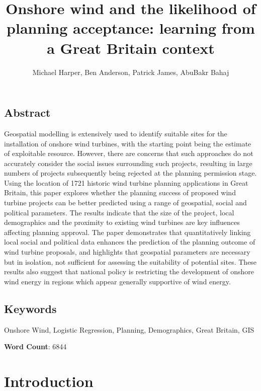 \documentclass[a4paper,]{article}
\title{Onshore wind and the likelihood of planning acceptance: learning from a Great Britain context}
\author{Michael Harper, Ben Anderson, Patrick James, AbuBakr Bahaj}
\date{}
\theoremstyle{definition}
\theoremstyle{definition}
\theoremstyle{definition}
\theoremstyle{remark}
\begin{document}
\maketitle

\hypertarget{abstract}{%
\subsection*{Abstract}\label{abstract}}

Geospatial modelling is extensively used to identify suitable sites for the installation of onshore wind turbines, with the starting point being the estimate of exploitable resource. However, there are concerns that such approaches do not accurately consider the social issues surrounding such projects, resulting in large numbers of projects subsequently being rejected at the planning permission stage. Using the location of 1721 historic wind turbine planning applications in Great Britain, this paper explores whether the planning success of proposed wind turbine projects can be better predicted using a range of geospatial, social and political parameters. The results indicate that the size of the project, local demographics and the proximity to existing wind turbines are key influences affecting planning approval. The paper demonstrates that quantitatively linking local social and political data enhances the prediction of the planning outcome of wind turbine proposals, and highlights that geospatial parameters are necessary but in isolation, not sufficient for assessing the suitability of potential sites. These results also suggest that national policy is restricting the development of onshore wind energy in regions which appear generally supportive of wind energy.

\hypertarget{keywords}{%
\subsection*{Keywords}\label{keywords}}

Onshore Wind, Logistic Regression, Planning, Demographics, Great Britain, GIS

\textbf{Word Count}: 6844

\hypertarget{introduction}{%
\section{Introduction}\label{introduction}}
\end{document}
